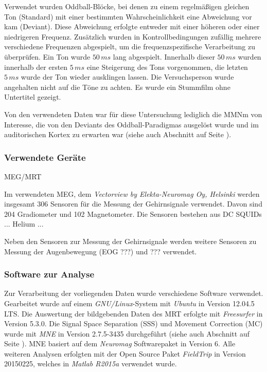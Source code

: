 \documentclass[doc,a4paper,12pt]{apa6}
\makeatletter
\DeclareRobustCommand*{\nameref}[1]{%
      \glqq{\myorg@nameref{#1}}\grqq%
    }%
\makeatother
\begin{document}
Verwendet wurden Oddball-Blöcke, bei denen zu einem regelmäßigen gleichen Ton (Standard) mit einer bestimmten Wahrscheinlichkeit eine Abweichung vor kam (Deviant). Diese Abweichung erfolgte entweder mit einer höheren oder einer niedrigeren Frequenz. Zusätzlich wurden in Kontrollbedingungen zufällig mehrere verschiedene Frequenzen abgespielt, um die frequenzspezifische Verarbeitung zu überprüfen. Ein Ton wurde $50\,ms$ lang abgespielt. Innerhalb dieser $50\,ms$ wurden innerhalb der ersten $5\,ms$ eine Steigerung des Tons vorgenommen, die letzten $5\,ms$ wurde der Ton wieder ausklingen lassen. Die Versuchsperson wurde angehalten nicht auf die Töne zu achten. Es wurde ein Stummfilm ohne Untertitel gezeigt.

Von den verwendeten Daten war für diese Untersuchung lediglich die MMNm von Interesse, die von den Deviants des Oddball-Paradigmas ausgelöst wurde und im auditorischen Kortex zu erwarten war (siehe auch Abschnitt \nameref{sec:audicort} auf Seite \pageref{sec:audicort}).

\subsubsection{Verwendete Geräte}

MEG/MRT

Im verwendeten MEG, dem \emph{Vectorview by Elekta-Neuromag Oy, Helsinki} werden insgesamt 306 Sensoren für die Messung der Gehirnsignale verwendet. Davon sind 204 Gradiometer und 102 Magnetometer. Die Sensoren bestehen aus DC SQUIDs ... Helium ...

Neben den Sensoren zur Messung der Gehirnsignale werden weitere Sensoren zu Messung der Augenbewegung (EOG ???) und ??? verwendet.


\subsubsection{Software zur Analyse}
\label{sec:software}

Zur Verarbeitung der vorliegenden Daten wurde verschiedene Software verwendet. Gearbeitet wurde auf einem \emph{GNU/Linux}-System mit \emph{Ubuntu} in Version 12.04.5 LTS. Die Auswertung der bildgebenden Daten des MRT erfolgte mit \emph{Freesurfer} in Version 5.3.0. Die Signal Space Separation (SSS) und Movement Correction (MC) wurde mit \emph{MNE} in Version 2.7.5-3435 durchgeführt (siehe auch Abschnitt \nameref{sec:maxfilter} auf Seite \pageref{sec:maxfilter}). MNE basiert auf dem \emph{Neuromag} Softwarepaket in Version 6. Alle weiteren Analysen erfolgten mit der Open Source Paket \emph{FieldTrip} in Version 20150225, welches in \emph{Matlab R2015a} verwendet wurde.
\end{document}
